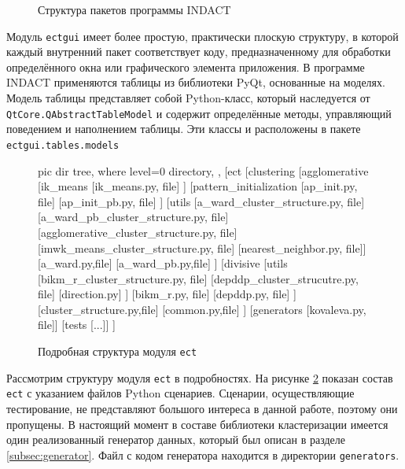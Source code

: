 \documentclass[12pt]{diploma}
\begin{document}
	\begin{figure}[h!]
		\centering
		
		\caption{Структура пакетов программы INDACT}
		\label{fig:packages}
	\end{figure}
	
	Модуль \texttt{ectgui} имеет более простую, практически плоскую структуру, в которой каждый внутренний пакет соответствует коду, предназначенному для обработки определённого окна или графического элемента приложения. В программе INDACT применяются таблицы из библиотеки PyQt, основанные на моделях. Модель таблицы представляет собой \mbox{Python-класс}, который наследуется от \texttt{QtCore.QAbstractTableModel} и содержит определённые методы, управляющий поведением и наполнением таблицы. Эти классы и расположены в пакете \texttt{ectgui.tables.models}
	
	
	\begin{figure}[h!]
		\centering
		\begin{forest}
			pic dir tree,
			where level=0{}{%
				directory,
			},
			[ect	
			[clustering 
			[agglomerative 
			[ik\_means 
			[ik\_means.py, file]
			]
			[pattern\_initialization
			[ap\_init.py, file] 
			[ap\_init\_pb.py, file]
			] 
			[utils 
			[a\_ward\_cluster\_structure.py, file] 
			[a\_ward\_pb\_cluster\_structure.py, file] [agglomerative\_cluster\_structure.py, file] [imwk\_means\_cluster\_structure.py, file] 
			[nearest\_neighbor.py, file]] 
			[a\_ward.py,file] 
			[a\_ward\_pb.py,file]
			] 
			[divisive
			[utils
			[bikm\_r\_cluster\_structure.py, file]
			[depddp\_cluster\_strucutre.py, file]
			[direction.py]
			]
			[bikm\_r.py, file]
			[depddp.py, file]
			]
			[cluster\_structure.py,file]
			[common.py,file]
			]
			[generators [kovaleva.py, file]]
			[tests [...]]
			]
		\end{forest}
		\caption{Подробная структура модуля \texttt{ect}}
		\label{fig:ect-tree}
	\end{figure}	
	
	
	Рассмотрим структуру модуля \texttt{ect} в подробностях. На рисунке \ref{fig:ect-tree} показан состав \texttt{ect} с указанием файлов Python сценариев. Сценарии, осуществляющие тестирование, не представляют большого интереса в данной работе, поэтому они пропущены. В настоящий момент в составе библиотеки кластеризации имеется один реализованный генератор данных, который был описан в разделе \ref{subsec:generator}. Файл с кодом генератора находится в директории \texttt{generators}.
	
\end{document}

